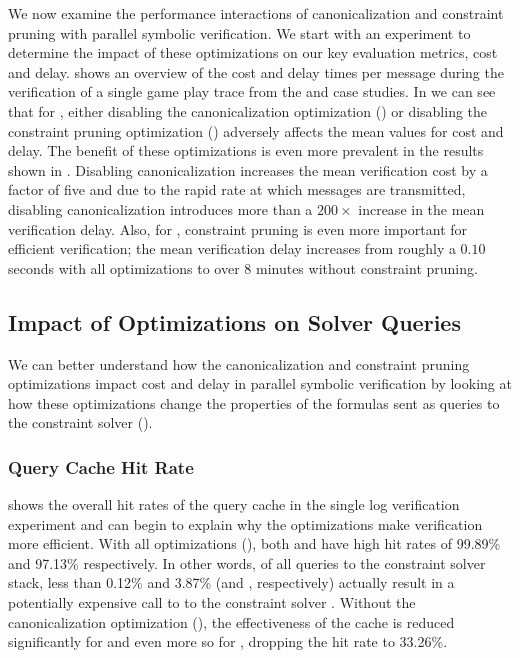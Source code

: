We now examine the performance interactions of canonicalization and
constraint pruning with parallel symbolic verification. We start with
an experiment to determine the impact of these optimizations on our key
evaluation metrics, cost and delay.  shows
an overview of the cost and delay times per message during the
verification of a single game play trace from the \tetrinet and
\xpilot case studies. In  we can
see that for \tetrinet, either disabling the canonicalization
optimization (\nocanon) or disabling the constraint pruning optimization (\noprune)
adversely affects the mean values for cost and delay. The
benefit of these optimizations is even more prevalent in the \xpilot
results shown in . Disabling
canonicalization increases the mean verification cost by a factor of
five and due to the rapid rate at which \xpilot messages are
transmitted, disabling canonicalization introduces more than a $200
\times$ increase in the mean verification delay. Also, for \xpilot,
constraint pruning is even more important for efficient verification;
the mean verification delay increases from roughly a $0.10$ seconds
with all optimizations to over $8$ minutes without constraint pruning.

\subsection{Impact of Optimizations on Solver Queries}

We can better understand how the canonicalization and constraint
pruning  optimizations impact cost and delay in parallel symbolic
verification by looking at how these optimizations change the
properties of the formulas sent as queries to the constraint solver
(\stp).

\subsubsection{Query Cache Hit Rate}
 shows the overall hit rates of the query
cache in the single log verification experiment and can begin to
explain why the optimizations make verification more efficient.
With all optimizations (\allopt), both \tetrinet and
\xpilot have high hit rates of 99.89\% and 97.13\% respectively. In
other words, of all queries to the constraint solver stack, less than
0.12\% and 3.87\% (\tetrinet and \xpilot, respectively) actually
result in a potentially expensive call to to the constraint solver
\stp. Without the canonicalization optimization (\nocanon), the
effectiveness of the cache is reduced significantly for \tetrinet and
even more so for \xpilot, dropping the hit rate to 33.26\%.

